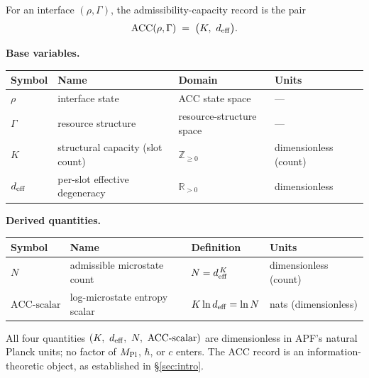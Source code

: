 \documentclass[11pt]{article}
\newcommand{\Mpl}{M_{\rm Pl}}
\begin{document}
\begin{tcolorbox}[defbox, title={Definition --- Admissibility-Capacity Record $\mathrm{ACC}(\rho, \Gamma)$}]
For an interface $(\rho, \Gamma)$, the admissibility-capacity record is the pair
\[
\mathrm{ACC}(\rho, \Gamma) \;=\; \bigl(K,\ d_{\rm eff}\bigr).
\]

\smallskip

\noindent\textbf{Base variables.}

{\footnotesize
\begin{tabularx}{\linewidth}{@{}l l X l@{}}
\toprule
\textbf{Symbol} & \textbf{Name} & \textbf{Domain} & \textbf{Units} \\
\midrule
$\rho$        & interface state                   & ACC state space           & --- \\
$\Gamma$      & resource structure                & resource-structure space  & --- \\
$K$           & structural capacity (slot count)   & $\mathbb{Z}_{\geq 0}$     & dimensionless (count) \\
$d_{\rm eff}$ & per-slot effective degeneracy      & $\mathbb{R}_{>0}$         & dimensionless \\
\bottomrule
\end{tabularx}
}

\smallskip

\noindent\textbf{Derived quantities.}

{\footnotesize
\begin{tabularx}{\linewidth}{@{}l l X l@{}}
\toprule
\textbf{Symbol} & \textbf{Name} & \textbf{Definition} & \textbf{Units} \\
\midrule
$N$                         & admissible microstate count    & $N = d_{\rm eff}^{\,K}$         & dimensionless (count) \\
$\mathrm{ACC}\text{-scalar}$ & log-microstate entropy scalar  & $K \ln d_{\rm eff} = \ln N$     & nats (dimensionless) \\
\bottomrule
\end{tabularx}
}

\smallskip

\noindent All four quantities $(K,\ d_{\rm eff},\ N,\ \mathrm{ACC}\text{-scalar})$ are dimensionless in APF's natural Planck units; no factor of $\Mpl$, $\hbar$, or $c$ enters. The ACC record is an information-theoretic object, as established in \S\ref{sec:intro}.

\smallskip


\end{tcolorbox}
\end{document}
